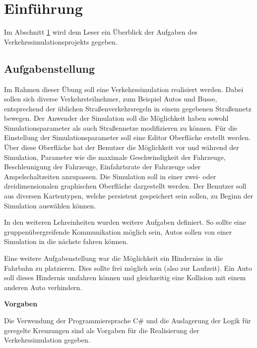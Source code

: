 
\chapter{Einführung}
\label{Einführung}

Im Abschnitt \ref{Einführung} wird dem Leser ein Überblick der Aufgaben des Verkehrssimulationsprojekts gegeben.

\thispagestyle{standard}
\pagestyle{standard}

\section{Aufgabenstellung}
\label{Aufgabenstellung}

Im Rahmen dieser Übung soll eine Verkehrssimulation realisiert werden. Dabei sollen sich diverse Verkehrsteilnehmer, zum Beispiel Autos und Busse, entsprechend der üblichen Straßenverkehrsregeln in einem gegebenen Straßennetz bewegen. Der Anwender der Simulation soll die Möglichkeit haben sowohl Simulationsparameter als auch Straßennetze modifizieren zu können. Für die Einstellung der Simulationsparameter soll eine Editor Oberfläche erstellt werden. Über diese Oberfläche hat der Benutzer die Möglichkeit vor und während der Simulation, Parameter wie die maximale Geschwindigkeit der Fahrzeuge, Beschleunigung der Fahrzeuge, Einfahrtsrate der Fahrzeuge oder Ampelschaltzeiten anzupassen. Die Simulation soll in einer zwei- oder dreidimensionalen graphischen Oberfläche dargestellt werden. Der Benutzer soll aus diversen Kartentypen, welche persistent gespeichert sein sollen, zu Beginn der Simulation auswählen können. 

In den weiteren Lehreinheiten wurden weitere Aufgaben definiert. So sollte eine gruppenübergreifende Kommunikation möglich sein, Autos sollen von einer Simulation in die nächste fahren können.

Eine weitere Aufgabenstellung war die Möglichkeit ein  Hinderniss in die Fahrbahn zu platzieren. Dies sollte frei möglich sein (also zur Laufzeit). Ein Auto soll dieses Hindernis umfahren können und gleichzeitig eine Kollision mit einem anderen Auto verhindern.


\begin{flushleft}
\textbf{Vorgaben}
\end{flushleft}
\vspace{-0.3 cm}

Die Verwendung der Programmiersprache C\# und die Auslagerung der Logik für geregelte Kreuzungen sind als Vorgaben für die Realisierung der Verkehrssimulation gegeben.
